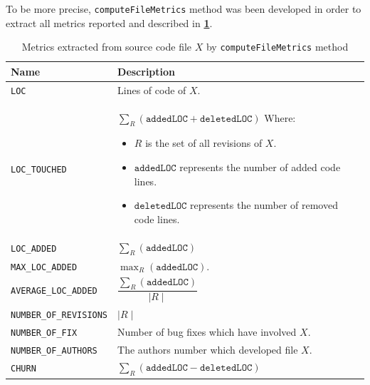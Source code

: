 \documentclass[sigconf]{acmart}
\begin{document}
To be more precise, \texttt{compute\-File\-Metrics} method was been developed in order to extract all metrics reported and described in \textbf{\cref{metrics}}. 

\begin{table}
\caption{Metrics extracted from source code file $X$ by \texttt{compute\-File\-Metrics} method}
\label{metrics}
\begin{tabular}{l|p{4.3cm}}
\toprule
\textbf{Name} & \textbf{Description} \\
\midrule

\texttt{LOC} & Lines of code of $X$. 

\\

\texttt{LOC\_TOUCHED} & $\sum_R (\texttt{addedLOC} + \texttt{deletedLOC})$ \newline Where: 

\begin{itemize}
\item $R$ is the set of all revisions of $X$.
\item $\texttt{addedLOC}$ represents the number of added code lines.
\item $\texttt{deletedLOC}$ represents the number of removed code lines.
\end{itemize}

\\

\texttt{LOC\_ADDED} & $\sum_R (\texttt{addedLOC})$

\\

\texttt{MAX\_LOC\_ADDED} & $\max_R (\texttt{addedLOC})$.

\\
    
\texttt{AVERAGE\_LOC\_ADDED} & $\dfrac{\sum_R (\texttt{addedLOC})}{\mid R \mid}$

\\

\texttt{NUMBER\_OF\_REVISIONS} & $\mid R \mid$ 

\\

\texttt{NUMBER\_OF\_FIX} & Number of bug fixes which have involved $X$.

\\

\texttt{NUMBER\_OF\_AUTHORS} & The authors number which developed file $X$.

\\

\texttt{CHURN} & $\sum_R (\texttt{addedLOC} - \texttt{deletedLOC})$


\end{tabular}
\end{table}
\end{document}
